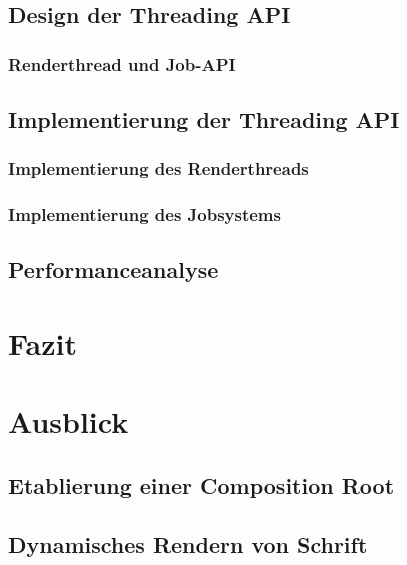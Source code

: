 \documentclass[12pt,a4paper,listof=totocnumbered,parskip=half,numbers=noendperiod]{scrartcl}
\begin{document}
\subsection{Design der Threading API}

\subsubsection{Renderthread und Job-API}


\subsection{Implementierung der Threading API}

\subsubsection{Implementierung des Renderthreads}



\subsubsection{Implementierung des Jobsystems}


\subsection{Performanceanalyse}


\section{Fazit}
\section{Ausblick}
\subsection{Etablierung einer Composition Root}

\subsection{Dynamisches Rendern von Schrift}
\end{document}
